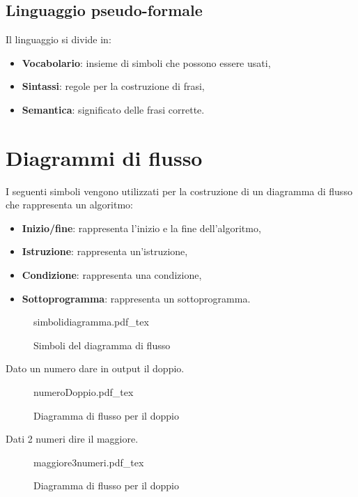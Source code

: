 \documentclass[a4paper]{article}
\theoremstyle{break}
\theoremstyle{break}
\theoremstyle{break}
\theoremstyle{break}
\newcommand{\incfig}[2][1]{%
	\def\svgwidth{#1\columnwidth}
	{#2.pdf_tex}
}
\begin{document}
\subsection{Linguaggio pseudo-formale}
Il linguaggio si divide in:
\begin{itemize}
	\item \textbf{Vocabolario}: insieme di simboli che possono essere usati,
	\item \textbf{Sintassi}: regole per la costruzione di frasi,
	\item \textbf{Semantica}: significato delle frasi corrette.
\end{itemize}

\section{Diagrammi di flusso}
I seguenti simboli vengono utilizzati per la costruzione di un diagramma
di flusso che rappresenta un algoritmo:
\begin{itemize}
	\item \textbf{Inizio/fine}: rappresenta l'inizio e la fine dell'algoritmo,
	\item \textbf{Istruzione}: rappresenta un'istruzione,
	\item \textbf{Condizione}: rappresenta una condizione,
	\item \textbf{Sottoprogramma}: rappresenta un sottoprogramma.
\end{itemize}

\begin{figure}[H]
	\centering
	\incfig[0.3]{simbolidiagramma}
	\caption{Simboli del diagramma di flusso}
	\label{fig:simbolidiagramma}
\end{figure}

Dato un numero dare in output il doppio.
\begin{figure}[H]
	\centering
	\incfig[0.3]{numeroDoppio}
	\caption{Diagramma di flusso per il doppio}
	\label{fig:doppio}
\end{figure}

Dati 2 numeri dire il maggiore.
\begin{figure}[H]
	\centering
	\incfig[1]{maggiore3numeri}
	\caption{Diagramma di flusso per il doppio}
	\label{fig:maggiore3numeri}
\end{figure}
\end{document}
